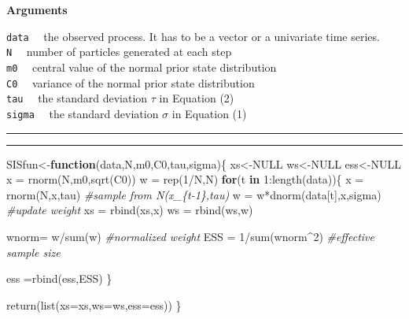 \documentclass[
]{article}
\newenvironment{Shaded}{\begin{snugshade}}{\end{snugshade}}
\newcommand{\AttributeTok}[1]{\textcolor[rgb]{0.77,0.63,0.00}{#1}}
\newcommand{\CommentTok}[1]{\textcolor[rgb]{0.56,0.35,0.01}{\textit{#1}}}
\newcommand{\ConstantTok}[1]{\textcolor[rgb]{0.00,0.00,0.00}{#1}}
\newcommand{\ControlFlowTok}[1]{\textcolor[rgb]{0.13,0.29,0.53}{\textbf{#1}}}
\newcommand{\DecValTok}[1]{\textcolor[rgb]{0.00,0.00,0.81}{#1}}
\newcommand{\FunctionTok}[1]{\textcolor[rgb]{0.00,0.00,0.00}{#1}}
\newcommand{\NormalTok}[1]{#1}
\newcommand{\OtherTok}[1]{\textcolor[rgb]{0.56,0.35,0.01}{#1}}
\newcommand{\SpecialCharTok}[1]{\textcolor[rgb]{0.00,0.00,0.00}{#1}}
\begin{document}
\textbf{Arguments}

\texttt{data} ~~the observed process. It has to be a vector or a
univariate time series.\\
\texttt{N} ~~number of particles generated at each step\\
\texttt{m0} ~~central value of the normal prior state distribution\\
\texttt{C0} ~~variance of the normal prior state distribution\\
\texttt{tau} ~~the standard deviation \(\tau\) in Equation (2)\\
\texttt{sigma} ~~the standard deviation \(\sigma\) in Equation (1)

\hrule
\hrule

\begin{Shaded}
\begin{Highlighting}[]
\NormalTok{SISfun}\OtherTok{\textless{}{-}}\ControlFlowTok{function}\NormalTok{(data,N,m0,C0,tau,sigma)\{}
\NormalTok{  xs}\OtherTok{\textless{}{-}}\ConstantTok{NULL}
\NormalTok{  ws}\OtherTok{\textless{}{-}}\ConstantTok{NULL}
\NormalTok{  ess}\OtherTok{\textless{}{-}}\ConstantTok{NULL}
\NormalTok{  x  }\OtherTok{=} \FunctionTok{rnorm}\NormalTok{(N,m0,}\FunctionTok{sqrt}\NormalTok{(C0))}
\NormalTok{  w  }\OtherTok{=} \FunctionTok{rep}\NormalTok{(}\DecValTok{1}\SpecialCharTok{/}\NormalTok{N,N)}
  \ControlFlowTok{for}\NormalTok{(t }\ControlFlowTok{in} \DecValTok{1}\SpecialCharTok{:}\FunctionTok{length}\NormalTok{(data))\{}
\NormalTok{    x    }\OtherTok{=} \FunctionTok{rnorm}\NormalTok{(N,x,tau)                   }\CommentTok{\#sample from N(x\_\{t{-}1\},tau)}
\NormalTok{    w    }\OtherTok{=}\NormalTok{ w}\SpecialCharTok{*}\FunctionTok{dnorm}\NormalTok{(data[t],x,sigma)         }\CommentTok{\#update weight}
\NormalTok{    xs }\OtherTok{=} \FunctionTok{rbind}\NormalTok{(xs,x)}
\NormalTok{    ws }\OtherTok{=} \FunctionTok{rbind}\NormalTok{(ws,w)}
    
\NormalTok{    wnorm}\OtherTok{=}\NormalTok{ w}\SpecialCharTok{/}\FunctionTok{sum}\NormalTok{(w)                         }\CommentTok{\#normalized weight}
\NormalTok{    ESS  }\OtherTok{=} \DecValTok{1}\SpecialCharTok{/}\FunctionTok{sum}\NormalTok{(wnorm}\SpecialCharTok{\^{}}\DecValTok{2}\NormalTok{)                   }\CommentTok{\#effective sample size}
    
\NormalTok{    ess }\OtherTok{=}\FunctionTok{rbind}\NormalTok{(ess,ESS)}
\NormalTok{  \}}
  
  \FunctionTok{return}\NormalTok{(}\FunctionTok{list}\NormalTok{(}\AttributeTok{xs=}\NormalTok{xs,}\AttributeTok{ws=}\NormalTok{ws,}\AttributeTok{ess=}\NormalTok{ess))}
\NormalTok{\}}
\end{Highlighting}
\end{Shaded}
\end{document}
